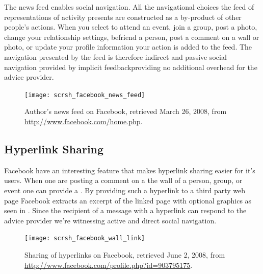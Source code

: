 The news feed enables social navigation. All the navigational choices the feed
of representations of activity presents are constructed as a by-product of
other people's actions. When you select to attend an event, join a group,
post a photo, change your relationship settings, befriend a person, post a
comment on a wall or photo, or update your profile information your action
is added to the feed. The navigation presented by the feed
is therefore indirect and passive social navigation provided by implicit
feedback\dash{}providing no additional overhead for the advice provider.

\begin{figure}
  \texttt{[image: scrsh\_facebook\_news\_feed]}
  \caption[Facebook News Feed]{%
     Author's news feed on Facebook,
     retrieved March 26, 2008, from \url{http://www.facebook.com/home.php}.}
  \label{figure:scrsh.facebook.news.feed}
\end{figure}


\subsection{Hyperlink Sharing}

Facebook have an interesting feature that makes hyperlink sharing easier for
it's users. When one are posting a comment on a the wall of a person, group,
or event one can provide a . By providing such a hyperlink to a
third party web page Facebook extracts an excerpt of the linked page with
optional graphics as seen in . Since the
recipient of a message with a hyperlink can respond to the advice provider
we're witnessing active and direct social navigation.

\begin{figure}
  \texttt{[image: scrsh\_facebook\_wall\_link]}
  \caption[Facebook Hyperlink Sharing]{%
     Sharing of hyperlinks on Facebook,
     retrieved June 2, 2008, from
     \url{http://www.facebook.com/profile.php?id=903795175}.}
  \label{figure:scrsh.facebook.wall.link}
\end{figure}

